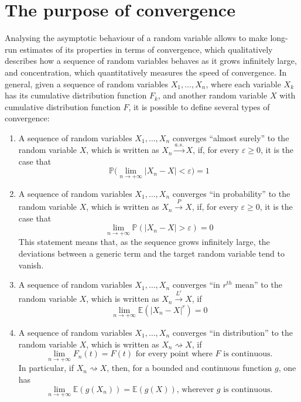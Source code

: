 \documentclass{report}
\begin{document}
\section{The purpose of convergence}
Analysing the asymptotic behaviour of a random variable allows to make long-run estimates of its properties in terms of convergence, which qualitatively describes how a sequence of random variables behaves as it grows infinitely large, and concentration, which quantitatively measures the speed of convergence. \newline
In general, given a sequence of random variables $\displaystyle X_1, \dots, X_n$, where each variable $\displaystyle X_k$ has its cumulative distribution function $\displaystyle F_k$, and another random variable $\displaystyle X$ with cumulative distribution function $\displaystyle F$, it is possible to define several types of convergence:
\begin{enumerate}
    \item A sequence of random variables $\displaystyle X_1, \dots, X_n$ converges ``almost surely'' to the random variable $\displaystyle X$, which is written as $\displaystyle X_n \xrightarrow{a. s.} X$, if, for every $\displaystyle \varepsilon \ge 0$, it is the case that
    \[\mathbb{P}\Bigg(\lim_{n \to +\infty} |X_n - X| < \varepsilon\Bigg) = 1\]
    \item A sequence of random variables $\displaystyle X_1, \dots, X_n$ converges ``in probability'' to the random variable $\displaystyle X$, which is written as $\displaystyle X_n \xrightarrow{P} X$, if, for every $\displaystyle \varepsilon \ge 0$, it is the case that
    \[\lim_{n \to +\infty} \mathbb{P}(|X_n - X| > \varepsilon) = 0\]
    This statement means that, as the sequence grows infinitely large, the deviations between a generic term and the target random variable tend to vanish.
    \item A sequence of random variables $\displaystyle X_1, \dots, X_n$ converges ``in $\displaystyle r^{th}$ mean'' to the random variable $\displaystyle X$, which is written as $\displaystyle X_n \xrightarrow{L^r} X$, if
    \[\lim_{n \to +\infty} \mathbb{E}(|X_n - X|^r) = 0\]
    \item A sequence of random variables $\displaystyle X_1, \dots, X_n$ converges ``in distribution'' to the random variable $\displaystyle X$, which is written as $\displaystyle X_n \rightsquigarrow X$, if
    \[\lim_{n \to +\infty} F_n(t) = F(t) \text{ for every point where $F$ is continuous.}\]
    In particular, if $\displaystyle X_n \rightsquigarrow X$, then, for a bounded and continuous function $\displaystyle g$, one has
    \[\lim_{n \to +\infty} \mathbb{E}(g(X_n)) = \mathbb{E}(g(X)) \text{, wherever $g$ is continuous.}\]
\end{enumerate}
\end{document}
